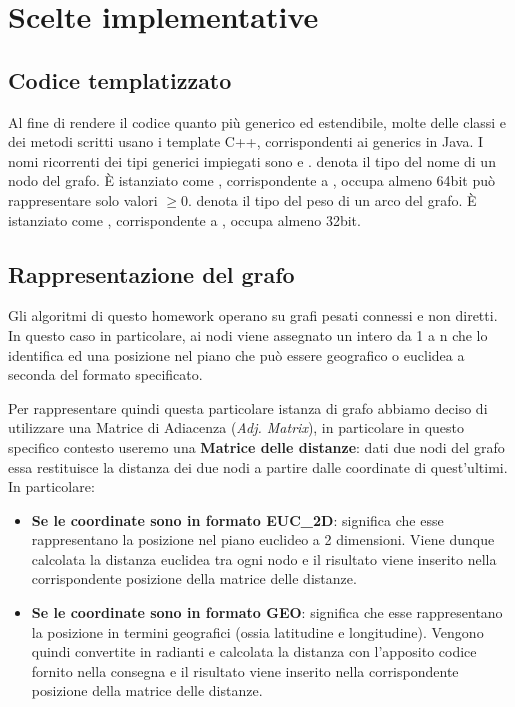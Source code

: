 \section{Scelte implementative}
\label{cap:implementation-choices}

\subsection{Codice templatizzato}

Al fine di rendere il codice quanto più generico ed estendibile, molte delle classi e dei metodi scritti
usano i template C++, corrispondenti ai generics in Java.
I nomi ricorrenti dei tipi generici impiegati sono  e .
 denota il tipo del nome di un nodo del grafo. È istanziato come , corrispondente a , occupa almeno 64bit può rappresentare solo valori $\geq 0$.
 denota il tipo del peso di un arco del grafo. È istanziato come , corrispondente a ,
occupa almeno 32bit.

\subsection{Rappresentazione del grafo}
\label{sub:graph-representation}

Gli algoritmi di questo homework operano su grafi pesati connessi e non diretti. In questo caso in particolare, ai nodi viene assegnato un intero da 1 a n che lo identifica ed una posizione nel piano che può essere geografico o euclidea a seconda del formato specificato.

\noindent Per rappresentare quindi questa particolare istanza di grafo abbiamo deciso di utilizzare una Matrice di Adiacenza (\textit{Adj. Matrix}), in particolare in questo specifico contesto useremo una \textbf{Matrice delle distanze}: dati due nodi del grafo essa restituisce la distanza dei due nodi a partire dalle coordinate di quest'ultimi. In particolare:
\begin{itemize}
    \item \textbf{Se le coordinate sono in formato EUC\_2D}: significa che esse rappresentano la posizione nel piano euclideo a 2 dimensioni. Viene dunque calcolata la distanza euclidea tra ogni nodo e il risultato viene inserito nella corrispondente posizione della matrice delle distanze.
    \item \textbf{Se le coordinate sono in formato GEO}: significa che esse rappresentano la posizione in termini geografici (ossia latitudine e longitudine). Vengono quindi convertite in radianti e calcolata la distanza con l'apposito codice fornito nella consegna e il risultato viene inserito nella corrispondente posizione della matrice delle distanze.
\end{itemize}

